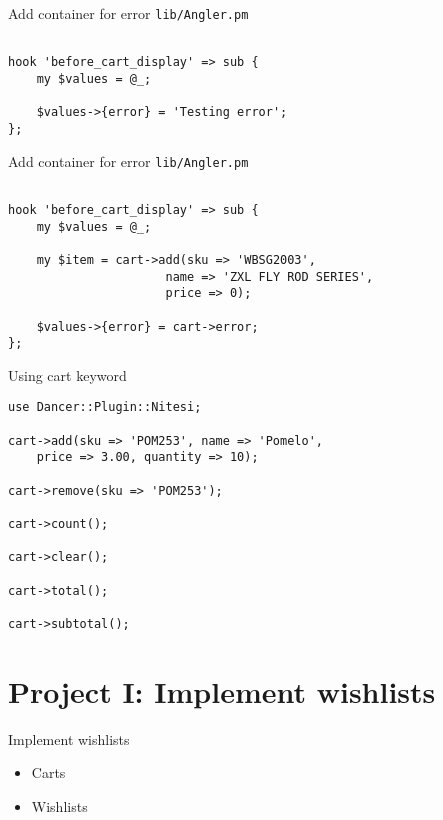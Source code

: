 \begin{frame}[fragile]{Add container for error}
\verb|lib/Angler.pm|

\begin{lstlisting}

hook 'before_cart_display' => sub {
    my $values = @_;

    $values->{error} = 'Testing error';
};
\end{lstlisting}
\end{frame}

\begin{frame}[fragile]{Add container for error}
\verb|lib/Angler.pm|

\begin{lstlisting}

hook 'before_cart_display' => sub {
    my $values = @_;

    my $item = cart->add(sku => 'WBSG2003',
                      name => 'ZXL FLY ROD SERIES',
                      price => 0);

    $values->{error} = cart->error;
};
\end{lstlisting}
\end{frame}

\begin{frame}[fragile]{Using cart keyword}
\begin{lstlisting}
use Dancer::Plugin::Nitesi;

cart->add(sku => 'POM253', name => 'Pomelo',
    price => 3.00, quantity => 10);

cart->remove(sku => 'POM253');

cart->count();

cart->clear();

cart->total();

cart->subtotal();
\end{lstlisting}
\end{frame}

\section{Project I: Implement wishlists}
\begin{frame}{Implement wishlists}
\begin{itemize}
\item Carts
\item Wishlists
\end{itemize}
\end{frame}



